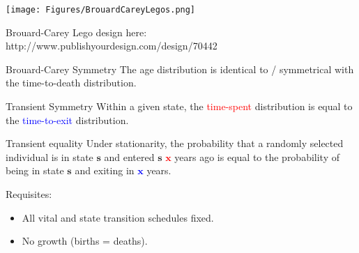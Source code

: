 \documentclass[20pt,usenames,dvipsnames]{beamer}
\begin{document}
\begin{frame}[plain]
\texttt{[image: Figures/BrouardCareyLegos.png]}

Brouard-Carey Lego design here:\\
http://www.publishyourdesign.com/design/70442
\end{frame}


\begin{frame}[plain]
\Large
 \begin{block}{Brouard-Carey Symmetry}
  The age distribution is identical to / symmetrical with the time-to-death distribution.
 \end{block}
\end{frame}

\begin{frame}[plain]
\Large
 \begin{block}{Transient Symmetry}
  Within a given \textcolor{OliveGreen}{state}, the \textcolor{red}{time-spent}
  distribution is equal to the \textcolor{blue}{time-to-exit} distribution.
 \end{block}
\end{frame}

\begin{frame}[plain]
\Large
 \begin{block}{Transient equality}
  Under stationarity, the probability that a randomly selected individual is in
  state \textcolor{OliveGreen}{$\mathbf{s}$} and entered
  \textcolor{OliveGreen}{$\mathbf{s}$} \textcolor{red}{$\mathbf{x}$} years ago
  is equal to the probability of being in state
  \textcolor{OliveGreen}{$\mathbf{s}$} and exiting in
  \textcolor{blue}{$\mathbf{x}$} years.
 \end{block}
\end{frame}

\begin{frame}[plain]
\Large
\centering
Requisites:
\begin{itemize}
\item All vital and state transition schedules fixed.
\item No growth (births = deaths).
\end{itemize}
\end{frame}
\end{document}
